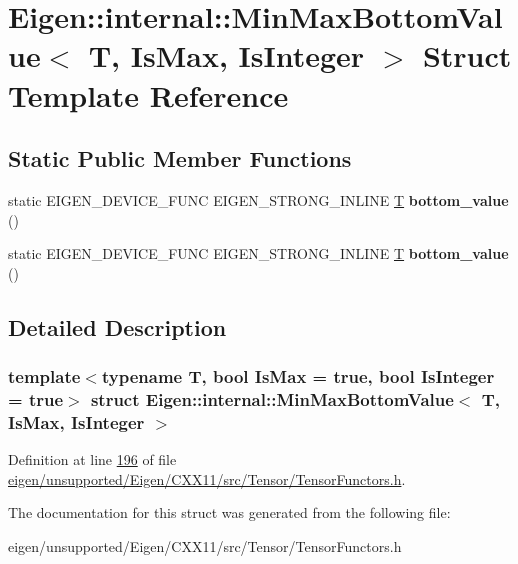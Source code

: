 \hypertarget{struct_eigen_1_1internal_1_1_min_max_bottom_value}{}\section{Eigen\+:\+:internal\+:\+:Min\+Max\+Bottom\+Value$<$ T, Is\+Max, Is\+Integer $>$ Struct Template Reference}
\label{struct_eigen_1_1internal_1_1_min_max_bottom_value}
\subsection*{Static Public Member Functions}
\begin{DoxyCompactItemize}
\item 
\mbox{\label{struct_eigen_1_1internal_1_1_min_max_bottom_value_ad40fc0cfe19605d15cde305048376152}} 
static E\+I\+G\+E\+N\+\_\+\+D\+E\+V\+I\+C\+E\+\_\+\+F\+U\+NC E\+I\+G\+E\+N\+\_\+\+S\+T\+R\+O\+N\+G\+\_\+\+I\+N\+L\+I\+NE \hyperlink{group___sparse_core___module}{T} {\bfseries bottom\+\_\+value} ()
\item 
\mbox{\label{struct_eigen_1_1internal_1_1_min_max_bottom_value_ad40fc0cfe19605d15cde305048376152}} 
static E\+I\+G\+E\+N\+\_\+\+D\+E\+V\+I\+C\+E\+\_\+\+F\+U\+NC E\+I\+G\+E\+N\+\_\+\+S\+T\+R\+O\+N\+G\+\_\+\+I\+N\+L\+I\+NE \hyperlink{group___sparse_core___module}{T} {\bfseries bottom\+\_\+value} ()
\end{DoxyCompactItemize}


\subsection{Detailed Description}
\subsubsection*{template$<$typename T, bool Is\+Max = true, bool Is\+Integer = true$>$\newline
struct Eigen\+::internal\+::\+Min\+Max\+Bottom\+Value$<$ T, Is\+Max, Is\+Integer $>$}



Definition at line \hyperlink{eigen_2unsupported_2_eigen_2_c_x_x11_2src_2_tensor_2_tensor_functors_8h_source_l00196}{196} of file \hyperlink{eigen_2unsupported_2_eigen_2_c_x_x11_2src_2_tensor_2_tensor_functors_8h_source}{eigen/unsupported/\+Eigen/\+C\+X\+X11/src/\+Tensor/\+Tensor\+Functors.\+h}.



The documentation for this struct was generated from the following file\+:\begin{DoxyCompactItemize}
\item 
eigen/unsupported/\+Eigen/\+C\+X\+X11/src/\+Tensor/\+Tensor\+Functors.\+h\end{DoxyCompactItemize}
